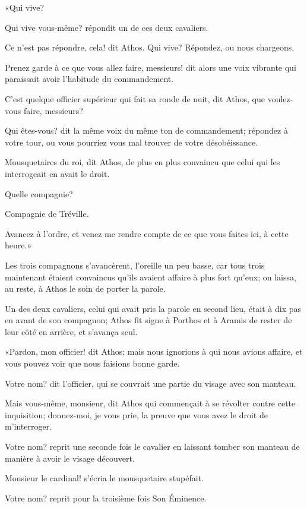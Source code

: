 «Qui vive? 

\speak  Qui vive vous-même? répondit un de ces deux cavaliers. 

\speak  Ce n'est pas répondre, cela! dit Athos. Qui vive? Répondez, ou nous chargeons. 

\speak  Prenez garde à ce que vous allez faire, messieurs! dit alors une voix vibrante qui paraissait avoir l'habitude du commandement. 

\speak  C'est quelque officier supérieur qui fait sa ronde de nuit, dit Athos, que voulez-vous faire, messieurs? 

\speak  Qui êtes-vous? dit la même voix du même ton de commandement; répondez à votre tour, ou vous pourriez vous mal trouver de votre désobéissance. 

\speak  Mousquetaires du roi, dit Athos, de plus en plus convaincu que celui qui les interrogeait en avait le droit. 

\speak  Quelle compagnie? 

\speak  Compagnie de Tréville. 

\speak  Avancez à l'ordre, et venez me rendre compte de ce que vous faites ici, à cette heure.» 

Les trois compagnons s'avancèrent, l'oreille un peu basse, car tous trois maintenant étaient convaincus qu'ils avaient affaire à plus fort qu'eux; on laissa, au reste, à Athos le soin de porter la parole. 

Un des deux cavaliers, celui qui avait pris la parole en second lieu, était à dix pas en avant de son compagnon; Athos fit signe à Porthos et à Aramis de rester de leur côté en arrière, et s'avança seul. 

«Pardon, mon officier! dit Athos; mais nous ignorions à qui nous avions affaire, et vous pouvez voir que nous faisions bonne garde. 

\speak  Votre nom? dit l'officier, qui se couvrait une partie du visage avec son manteau. 

\speak  Mais vous-même, monsieur, dit Athos qui commençait à se révolter contre cette inquisition; donnez-moi, je vous prie, la preuve que vous avez le droit de m'interroger. 

\speak  Votre nom? reprit une seconde fois le cavalier en laissant tomber son manteau de manière à avoir le visage découvert. 

\speak  Monsieur le cardinal! s'écria le mousquetaire stupéfait. 

\speak  Votre nom? reprit pour la troisième fois Son Éminence. 

